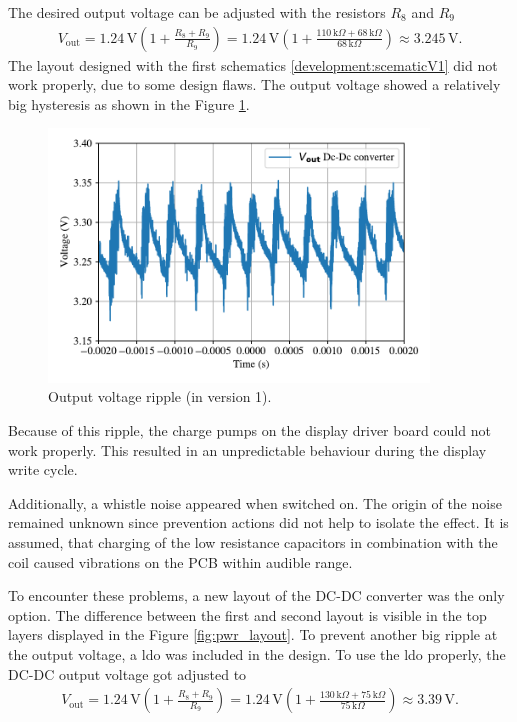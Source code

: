 The desired output voltage can be adjusted with the resistors $R_8$ and $R_9$
\begin{align}
V_{\text{out}}= 1.24\,\text{V} \left(1 + \frac{R_8+R_9}{R_9} \right)= 1.24\,\text{V} \left(1 + \frac{110\,\text{k}\Omega+68\,\text{k}\Omega}{68\,\text{k}\Omega} \right) \approx 3.245\,\text{V}.
\end{align}
The layout designed with the first schematics \ref{development:scematicV1} did not work properly, due to some design flaws.
The output voltage showed a relatively big hysteresis as shown in the Figure \ref{development:rippel}.  
\begin{figure}[ht]
	\centering
	\includegraphics[width=0.9\textwidth]{4-development/hardware/graphics/scope/rippel.pdf}
	\caption{Output voltage ripple (in version 1).\label{development:rippel}}
\end{figure}

Because of this ripple, the charge pumps on the display driver board could not work properly.
This resulted in an unpredictable behaviour during the display write cycle. 

Additionally, a whistle noise appeared when switched on.
The origin of the noise remained unknown since prevention actions did not help to isolate the effect.
It is assumed, that charging of the low resistance capacitors in combination with the coil caused vibrations on the PCB within audible range.

\clearpage
To encounter these problems, a new layout of the DC-DC converter was the only option.
The difference between the first and second layout is visible in the top layers displayed in the Figure \ref{fig:pwr_layout}.
To prevent another big ripple at the output voltage, a \acf{ldo} was included in the design. To use the \acs{ldo} properly, the DC-DC output voltage got adjusted to
\begin{align}
V_{\text{out}}= 1.24\,\text{V} \left(1 + \frac{R_8+R_9}{R_9} \right)= 1.24\,\text{V} \left(1 + \frac{130\,\text{k}\Omega+75\,\text{k}\Omega}{75\,\text{k}\Omega} \right) \approx 3.39\,\text{V}.
\end{align}

